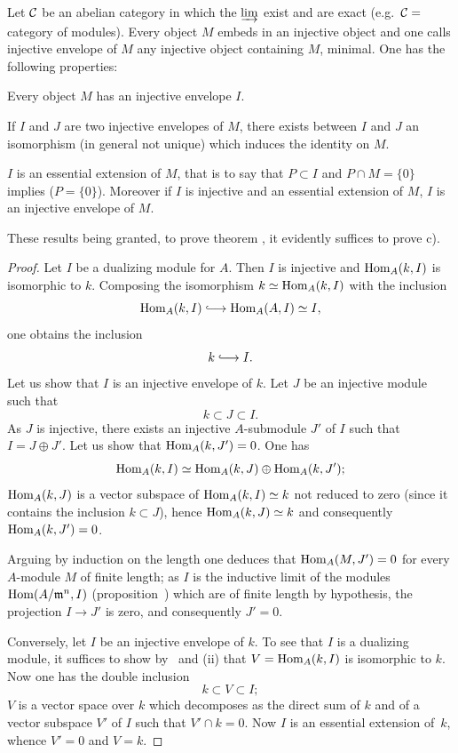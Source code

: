 Let ${\mathcal C}$ be an abelian category in which the $\varinjlim$ exist and are exact (e.g.\ ${\mathcal C}=$category of modules). Every object $M$ embeds in an injective object and one calls injective envelope of $M$ any injective object containing $M$, minimal. One has the following properties:
\begin{enumeratei}
\item
Every object $M$ has an injective envelope $I$.
\item
If $I$ and $J$ are two injective envelopes of $M$, there exists between $I$ and $J$ an isomorphism (in general not unique) which induces the identity on $M$.
\item
$I$ is an essential extension\label{pIV.13} of $M$, that is to say that $P\subset I$ and $P\cap M=\{ 0\}$ implies ($P=\{ 0\}$). Moreover if $I$ is injective and an essential extension of $M$, $I$ is an injective envelope of $M$.
\end{enumeratei}

These results being granted, to prove theorem , it evidently suffices to prove c).

\begin{proof}
Let $I$ be a dualizing module for $A$. Then $I$ is injective and $\operatorname{Hom}_{A}(k, I)$ is isomorphic to $k$. Composing the isomorphism $k\simeq \operatorname{Hom}_{A}(k, I)$ with the inclusion
$$
\Hom_{A}(k, I)\hto \Hom_{A}(A, I)\simeq I,
$$
one obtains the inclusion
$$
k\hto I.
$$
Let us show that $I$ is an injective envelope of $k$. Let $J$ be an injective module such that
$$
k\subset J\subset I.
$$
As $J$ is injective, there exists an injective $A$-submodule $J'$ of $I$ such that $I=J\oplus J'$. Let us show that $\operatorname{Hom}_{A}(k, J')=0$. One has
$$
\operatorname{Hom}_{A}(k, I)\simeq \operatorname{Hom}_{A}(k, J)\oplus \operatorname{Hom}_{A}(k, J');
$$
$\operatorname{Hom}_{A}(k, J)$ is a vector subspace of $\operatorname{Hom}_{A}(k, I)\simeq k$ not reduced to zero (since it contains the inclusion $k\subset J$), hence $\operatorname{Hom}_{A}(k, J)\simeq k$ and consequently $\operatorname{Hom}_{A}(k, J')=0$.

Arguing by induction on the length one deduces that $\operatorname{Hom}_{A}(M, J')=0$ for every $A$-module $M$ of finite length; as $I$ is the inductive limit of the modules $\operatorname{Hom}(A/\mathfrak{m}^n, I)$ (\cf proposition~) which are of finite length by hypothesis, the projection $I\to J'$ is zero, and consequently $J'=0$.

Conversely, let $I$ be an injective envelope of $k$. To see that $I$ is a dualizing module, it suffices to show by~ and  (ii) that $V=\operatorname{Hom}_{A}(k, I)$ is isomorphic to $k$. Now one has the double inclusion
$$
k\subset V\subset I;
$$
$V$ is a vector space over $k$ which decomposes as the direct sum of $k$ and of a vector subspace $V'$ of $I$ such that $V'\cap k=0$. Now $I$ is an essential extension of~$k$, whence $V'=0$ and $V=k$.
\skipqed
\end{proof}

